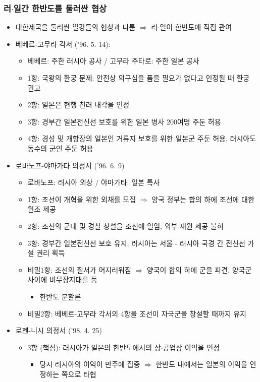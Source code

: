 \subsubsection*{러$\cdot$일간 한반도를 둘러싼 협상}
\begin{itemize}
    \item 대한제국을 둘러싼 열강들의 협상과 다툼 $\Rightarrow$ 러$\cdot$일이 한반도에 직접 관여
    \item 베베르-고무라 각서 ('96. 5. 14):
    \begin{itemize}
        \item 베베르: 주한 러시아 공사 / 고무라 주타로: 주한 일본 공사
        \item 1항: 국왕의 환궁 문제: 안전상 의구심을 품을 필요가 없다고 인정될 때 환궁 권고
        \item 2항: 일본은 현행 친러 내각을 인정
        \item 3항: 경부간 일본전신선 보호를 위한 일본 병사 200여명 주둔 허용
        \item 4항: 경성 및 개항장의 일본인 거류지 보호를 위한 일본군 주둔 허용, 러시아도 동수의 군인 주둔 허용
    \end{itemize}
    \item 로바노프-야마가타 의정서 ('96. 6. 9)
    \begin{itemize}
    \item 로바노프: 러시아 외상 / 야마가타: 일본 특사
    \item 1항: 조선이 개혁을 위한 외채를 모집 $\Rightarrow$ 양국 정부는 합의 하에 조선에 대한 원조 제공
    \item 2항: 조선의 군대 및 경찰 창설을 조선에 일임, 외부 재원 제공 불허
    \item 3항: 경부간 일본전신선 보호 유지, 러시아는 서울 - 러시아 국경 간 전신선 가설 권리 획득
    \item 비밀1항: 조선의 질서가 어지러워짐 $\Rightarrow$ 양국이 합의 하에 군을 파견, 양국군 사이에 비무장지대를 둠
    \begin{itemize}
        \item 한반도 분할론
    \end{itemize}
    \item 비밀2항: 베베르-고무라 각서의 4항을 조선이 자국군을 창설할 때까지 유지
    \end{itemize}
    \item 로젠-니시 의정서 ('98. 4. 25)
    \begin{itemize}
        \item 3항 (핵심): 러시아가 일본의 한반도에서의 상$\cdot$공업상 이익을 인정
        \begin{itemize}
            \item 당시 러시아의 이익이 만주에 집중 $\Rightarrow$ 한반도 내에서는 일본의 이익을 인정하는 쪽으로 타협
        \end{itemize}
    \end{itemize}
\end{itemize}

